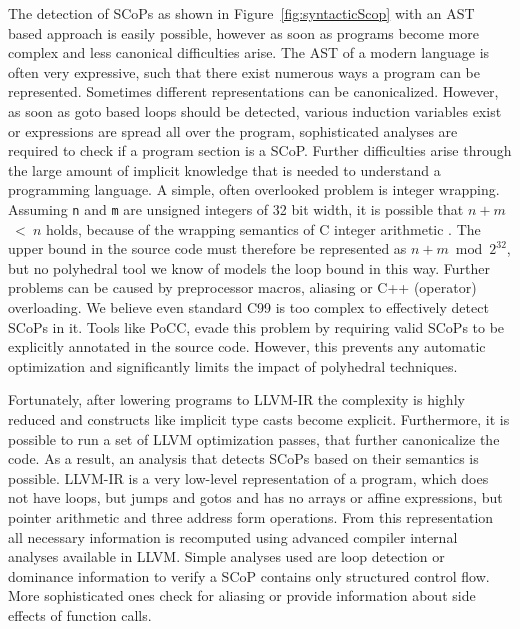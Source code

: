 \documentclass{acm_proc_article-sp}
\begin{document}
The detection of SCoPs as shown in Figure~\ref{fig:syntacticScop} with an AST
based approach is easily possible, however as soon as programs become more
complex and less canonical difficulties arise. The AST of a modern language is
often very expressive, such that there exist numerous ways a program can be
represented.  Sometimes different representations can be canonicalized.
However, as soon as goto based loops should be detected, various induction
variables exist or expressions are spread all over the program, sophisticated
analyses are required to check if a program section is a SCoP. Further
difficulties arise through the large amount of implicit knowledge that is
needed to understand a programming language.  A simple, often overlooked problem is integer
wrapping.  Assuming \texttt{n} and \texttt{m} are unsigned integers of 32 bit
width, it is possible that $n+m$~<~$n$ holds, because of the wrapping semantics
of C integer arithmetic \cite{c99}. The upper bound in the source code must
therefore be represented as $n+m\bmod 2^{32}$, but no polyhedral tool we know
of models the loop bound in this way. Further problems can be caused by
preprocessor macros, aliasing or C++ (operator) overloading. We believe even
standard C99 is too complex to effectively detect SCoPs in it. Tools like PoCC,
evade this problem by requiring valid SCoPs to be explicitly annotated in the
source code. However, this prevents any automatic optimization and
significantly limits the impact of polyhedral techniques.

Fortunately, after lowering programs to LLVM-IR the complexity is highly
reduced and constructs like implicit type casts become explicit. Furthermore,
it is possible to run a set of LLVM optimization passes, that further
canonicalize the code.  As a result, an
analysis that detects SCoPs based on their semantics is possible.  LLVM-IR is a
very low-level representation of a program, which does not have loops, but
jumps and gotos and has no arrays or affine expressions, but pointer arithmetic
and three address form operations. From this representation all necessary
information is recomputed using advanced compiler internal analyses available
in LLVM. Simple analyses used are loop detection or dominance information to
verify a SCoP contains only structured control flow. More sophisticated ones
check for aliasing or provide information about side effects of
function calls. 
\end{document}

